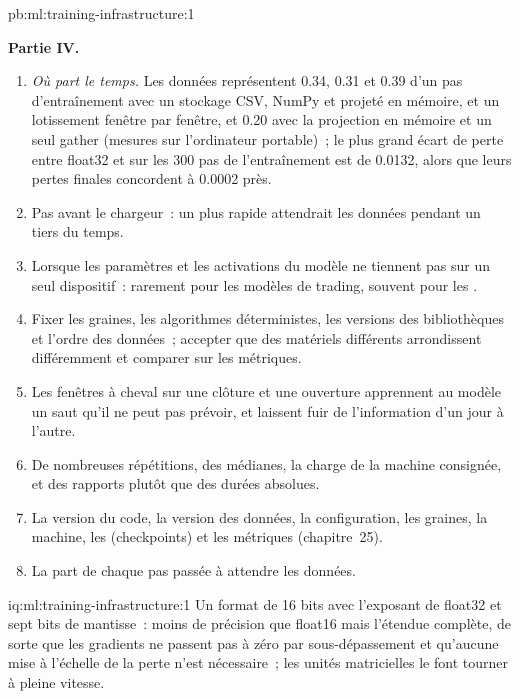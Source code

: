 \begin{solution}{pb:ml:training-infrastructure:1}
\begin{enumerate}[resume]
\end{enumerate}
\textbf{Partie IV.}
\begin{enumerate}[resume]
\item \emph{Où part le temps.} Les données représentent 0.34, 0.31 et 0.39 d'un pas d'entraînement avec un stockage CSV, NumPy et projeté en mémoire, et
un lotissement fenêtre par fenêtre, et 0.20 avec la projection en mémoire et un seul gather (mesures sur l'ordinateur portable)~; le plus grand écart de perte entre
float32 et  sur les 300 pas de l'entraînement est de 0.0132, alors que leurs pertes finales concordent à 0.0002 près.
\item Pas avant le chargeur~: un  plus rapide attendrait les données pendant un tiers du temps.
\item Lorsque les paramètres et les activations du modèle ne tiennent pas sur un seul dispositif~: rarement pour les modèles de trading, souvent pour les .
\item Fixer les graines, les algorithmes déterministes, les versions des bibliothèques et l'ordre des données~; accepter que des matériels différents arrondissent
différemment et comparer sur les métriques.
\item Les fenêtres à cheval sur une clôture et une ouverture apprennent au modèle un saut qu'il ne peut pas prévoir, et laissent fuir de l'information d'un jour à l'autre.
\item De nombreuses répétitions, des médianes, la charge de la machine consignée, et des rapports plutôt que des durées absolues.
\item La version du code, la version des données, la configuration, les graines, la machine, les  (checkpoints) et les métriques (chapitre~25).
\item La part de chaque pas passée à attendre les données.
\end{enumerate}
\end{solution}

\begin{solution}{iq:ml:training-infrastructure:1}
Un format de 16 bits avec l'exposant de float32 et sept bits de mantisse~: moins de précision que float16 mais l'étendue complète, de sorte que les gradients
ne passent pas à zéro par sous-dépassement et qu'aucune mise à l'échelle de la perte n'est nécessaire~; les unités matricielles le font tourner à pleine vitesse.
\end{solution}


